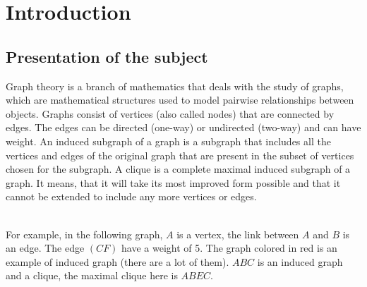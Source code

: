 
\section{Introduction}

\subsection{Presentation of the subject}

Graph theory is a branch of mathematics that deals with the study of graphs, which are mathematical structures used to model pairwise relationships between objects. Graphs consist of vertices (also called nodes) that are connected by edges. The edges can be directed (one-way) or undirected (two-way) and can have weight. An induced subgraph of a graph is a subgraph that includes all the vertices and edges of the original graph that are present in the subset of vertices chosen for the subgraph. A clique is a complete maximal induced subgraph of a graph. It means, that it will take its most improved form possible and that it cannot be extended to include any more vertices or edges.
\\ \\
\begin{minipage}{0.5\textwidth}
    For example, in the following graph, $A$ is a vertex, the link between $A$ and $B$ is an edge. The edge $(CF)$ have a weight of 5. The graph colored in red is an example of induced graph (there are a lot of them). $ABC$ is an induced graph and a clique, the maximal clique here is $ABEC$.
\end{minipage}
\begin{minipage}{0.5\textwidth}
    \begin{center}
    \end{center}
\end{minipage}

